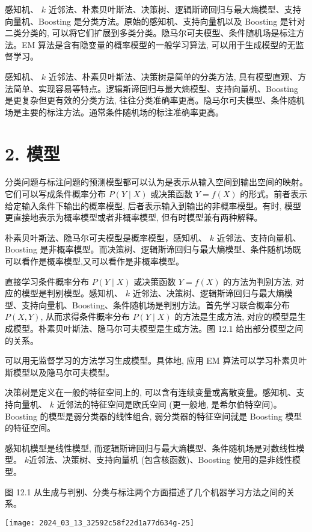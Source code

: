 \documentclass[10pt]{article}
\begin{document}
\begin{CJK*}{UTF8}{bsmi}
感知机、 $k$ 近邻法、朴素贝叶斯法、决策树、逻辑斯谛回归与最大熵模型、支持向量机、Boosting 是分类方法。原始的感知机、支持向量机以及 Boosting 是针对二类分类的, 可以将它们扩展到多类分类。隐马尔可夫模型、条件随机场是标注方法。EM 算法是含有隐变量的概率模型的一般学习算法, 可以用于生成模型的无监督学习。

感知机、 $k$ 近邻法、朴素贝叶斯法、决策树是简单的分类方法, 具有模型直观、方法简单、实现容易等特点。逻辑斯谛回归与最大熵模型、支持向量机、Boosting 是更复杂但更有效的分类方法, 往往分类准确率更高。隐马尔可夫模型、条件随机场是主要的标注方法。通常条件随机场的标注准确率更高。

\section*{2. 模型}
分类问题与标注问题的预测模型都可以认为是表示从输入空间到输出空间的映射。它们可以写成条件概率分布 $P(Y \mid X)$ 或决策函数 $Y=f(X)$ 的形式。前者表示给定输入条件下输出的概率模型, 后者表示输入到输出的非概率模型。有时, 模型更直接地表示为概率模型或者非概率模型, 但有时模型兼有两种解释。

朴素贝叶斯法、隐马尔可夫模型是概率模型，感知机、 $k$ 近邻法、支持向量机、Boosting 是非概率模型。而决策树、逻辑斯谛回归与最大熵模型、条件随机场既可以看作是概率模型,又可以看作是非概率模型。

直接学习条件概率分布 $P(Y \mid X)$ 或决策函数 $Y=f(X)$ 的方法为判别方法, 对应的模型是判别模型。感知机、 $k$ 近邻法、决策树、逻辑斯谛回归与最大熵模型、支持向量机、Boosting、条件随机场是判别方法。首先学习联合概率分布 $P(X, Y)$, 从而求得条件概率分布 $P(Y \mid X)$ 的方法是生成方法, 对应的模型是生成模型。朴素贝叶斯法、隐马尔可夫模型是生成方法。图 12.1 给出部分模型之间的关系。

可以用无监督学习的方法学习生成模型。具体地, 应用 EM 算法可以学习朴素贝叶斯模型以及隐马尔可夫模型。

决策树是定义在一般的特征空间上的, 可以含有连续变量或离散变量。感知机、支持向量机、 $k$ 近邻法的特征空间是欧氏空间 (更一般地, 是希尔伯特空间)。Boosting 的模型是弱分类器的线性组合, 弱分类器的特征空间就是 Boosting 模型的特征空间。

感知机模型是线性模型, 而逻辑斯谛回归与最大熵模型、条件随机场是对数线性模型。 $k$近邻法、决策树、支持向量机 (包含核函数)、Boosting 使用的是非线性模型。

图 12.1 从生成与判别、分类与标注两个方面描述了几个机器学习方法之间的关系。

\begin{center}
\texttt{[image: 2024\_03\_13\_32592c58f22d1a77d634g-25]}
\end{center}


\end{CJK*}
\end{document}

